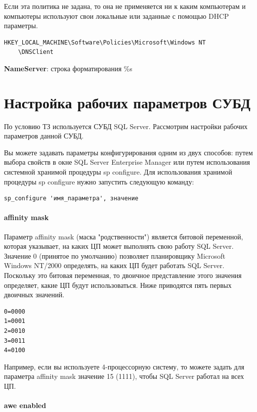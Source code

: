 \documentclass[russian,utf8,emptystyle]{eskdtext}
\begin{document}
Если эта политика не задана, то она не применяется ни к каким компьютерам и компьютеры используют свои локальные или заданные с помощью DHCP параметры.

\begin{verbatim}
HKEY_LOCAL_MACHINE\Software\Policies\Microsoft\Windows NT
	\DNSClient
\end{verbatim}

\textbf{NameServer}: строка форматирования \%s

\clearpage
\section{Настройка рабочих параметров СУБД}
По условию ТЗ используется СУБД SQL Server. Рассмотрим настройки рабочих параметров данной СУБД.

Вы можете задавать параметры конфигурирования одним из двух способов: путем выбора свойств в окне SQL Server Enterprise Manager или путем использования системной хранимой процедуры sp configure. Для использования хранимой процедуры sp configure нужно запустить следующую команду:

\begin{verbatim}
sp_configure 'имя_параметра', значение
\end{verbatim}

\paragraph{affinity mask}

Параметр affinity mask (маска "родственности") является битовой переменной, которая указывает, на каких ЦП может выполнять свою работу SQL Server. Значение 0 (принятое по умолчанию) позволяет планировщику Microsoft Windows NT/2000 определять, на каких ЦП будет работать SQL Server. Поскольку это битовая переменная, то двоичное представление этого значения определяет, какие ЦП будут использоваться. Ниже приводятся пять первых двоичных значений.
\begin{verbatim}
0=0000
1=0001
2=0010
3=0011
4=0100 
\end{verbatim}

Например, если вы используете 4-процессорную систему, то можете задать для параметра affinity mask значение 15 (1111), чтобы SQL Server работал на всех ЦП.


\paragraph{awe enabled}
\end{document}
